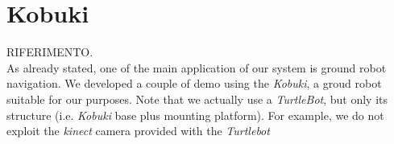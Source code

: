 \section{Kobuki}
 RIFERIMENTO.\\
As already stated, one of the main application of our system is ground robot navigation. We developed a couple of demo using the \emph{Kobuki}, a groud robot suitable for our purposes. Note that we actually use a \emph{TurtleBot}, but only its structure (i.e. \emph{Kobuki} base plus mounting platform). For example, we do not exploit the \emph{kinect} camera provided with the \emph{Turtlebot}